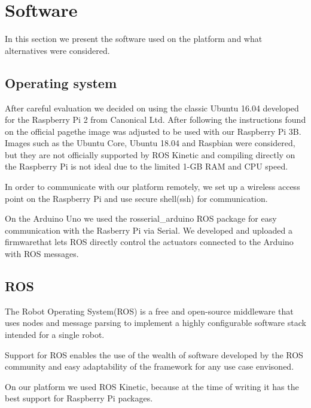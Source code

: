 \documentclass[class=article, crop=false]{standalone}
\begin{document}
\section{Software}\label{sec:software}
In this section we present the software used on the platform and what alternatives were considered.

\subsection{Operating system}\label{subsec:os}
After careful evaluation we decided on using the classic Ubuntu 16.04 developed for the Raspberry Pi 2 from Canonical Ltd. After following the instructions found on the official page\footnotemark the image was adjusted to be used with our Raspberry Pi 3B.
Images such as the Ubuntu Core, Ubuntu 18.04 and Raspbian were considered, but they are not officially supported by ROS Kinetic and compiling directly on the Raspberry Pi is not ideal due to the limited 1-GB RAM and CPU speed.

In order to communicate with our platform remotely, we set up a wireless access point on the Raspberry Pi and use secure shell(ssh) for communication.

On the Arduino Uno we used the rosserial\_arduino ROS package for easy communication with the Rasberry Pi via Serial. We developed and uploaded a firmware\footnotemark that lets ROS directly control the actuators connected to the Arduino with ROS messages.


\subsection{ROS}\label{subsec:ros}
The Robot Operating System(ROS) is a free and open-source middleware that uses nodes and message parsing to implement a highly configurable software stack intended for a single robot.

Support for ROS enables the use of the wealth of software developed by the ROS community and easy adaptability of the framework for any use case envisoned.

On our platform we used ROS Kinetic, because at the time of writing it has the best support for Raspberry Pi packages.
\end{document}

